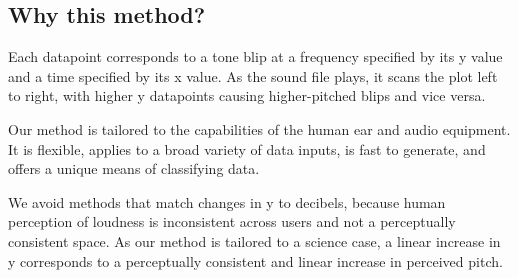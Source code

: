 \documentclass[]{acmsiggraph}
\begin{document}
\subsection{Why this method? }

Each datapoint corresponds to a tone blip at a frequency specified by its y value and a time specified by its x value. As the sound file plays, it scans the plot left to right, with higher y datapoints causing higher-pitched blips and vice versa.

Our method is tailored to the capabilities of the human ear and audio equipment. It is flexible, applies to a broad variety of data inputs, is fast to generate, and offers a unique means of classifying data.

We avoid methods that match changes in y to decibels, because human perception of loudness is inconsistent across users and not a perceptually consistent space. As our method is tailored to a science case, a linear increase in y corresponds to a perceptually consistent and linear increase in perceived pitch.







\end{document}
